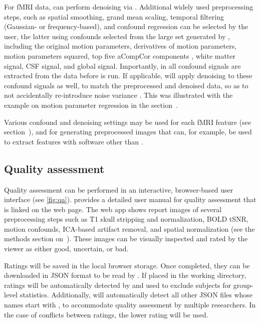 For fMRI data,  can perform denoising via 
\parencite{pruim2015}. Additional widely used
preprocessing steps, such as spatial smoothing, grand mean scaling,
temporal filtering (Gaussian- or frequency-based), and confound regression
can be selected by the user, the latter using confounds selected from the
large set generated by , including the original motion
parameters, derivatives of motion parameters, motion parameters squared,
top five aCompCor components \parencite{behzadi2007},
white matter signal, CSF signal, and global signal. Importantly, in
 all confound signals are extracted from the data before
 is run. If applicable,  will apply
denoising to these confound signals as well, to match the preprocessed and
denoised data, so as to not accidentally re-introduce noise variance
\parencite{hallquist2013,lindquist2019}. This was
illustrated with the example on motion parameter regression in the
section~.

Various confound and denoising settings may be used for each fMRI feature
(see section~), and for generating
preprocessed images that can, for example, be used to extract features with
software other than .

\subsection{Quality assessment}

Quality assessment can be performed in an interactive, browser-based user
interface (see \autoref{fig:qa}).  provides a
detailed user manual for quality assessment that is linked on the web page.
The web app shows report images of several preprocessing steps such as T1
skull stripping and normalization, BOLD tSNR, motion confounds, ICA-based
artifact removal, and spatial normalization (see the methods section
on~). These images can be visually inspected and
rated by the viewer as either good, uncertain, or bad.

Ratings will be saved in the local browser storage. Once completed, they
can be downloaded in JSON format to be read by . If placed
in the working directory, ratings will be automatically detected by
 and used to exclude subjects for group-level statistics.
Additionally,  will automatically detect all other JSON
files whose names start with , to accommodate quality
assessment by multiple researchers. In the case of conflicts between
ratings, the lower rating will be used.

